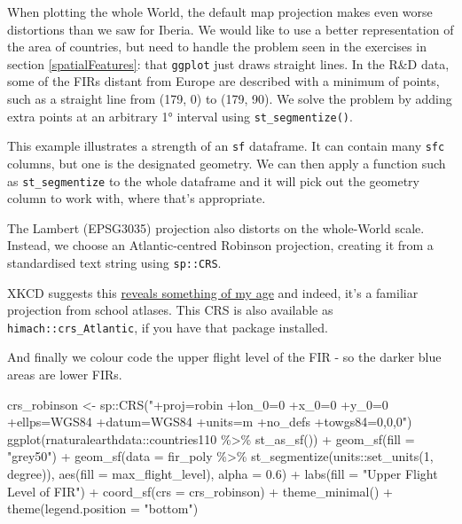 \documentclass[
]{book}
\newenvironment{Shaded}{\begin{snugshade}}{\end{snugshade}}
\newcommand{\AttributeTok}[1]{\textcolor[rgb]{0.77,0.63,0.00}{#1}}
\newcommand{\DecValTok}[1]{\textcolor[rgb]{0.00,0.00,0.81}{#1}}
\newcommand{\FloatTok}[1]{\textcolor[rgb]{0.00,0.00,0.81}{#1}}
\newcommand{\FunctionTok}[1]{\textcolor[rgb]{0.00,0.00,0.00}{#1}}
\newcommand{\NormalTok}[1]{#1}
\newcommand{\OtherTok}[1]{\textcolor[rgb]{0.56,0.35,0.01}{#1}}
\newcommand{\SpecialCharTok}[1]{\textcolor[rgb]{0.00,0.00,0.00}{#1}}
\newcommand{\StringTok}[1]{\textcolor[rgb]{0.31,0.60,0.02}{#1}}
\begin{document}
When plotting the whole World, the default map projection makes even worse distortions than we saw for Iberia. We would like to use a better representation of the area of countries, but need to handle the problem seen in the exercises in section \ref{spatialFeatures}: that \texttt{ggplot} just draws straight lines. In the R\&D data, some of the FIRs distant from Europe are described with a minimum of points, such as a straight line from (179, 0) to (179, 90). We solve the problem by adding extra points at an arbitrary 1° interval using \texttt{st\_segmentize()}.

This example illustrates a strength of an \texttt{sf} dataframe. It can contain many \texttt{sfc} columns, but one is the designated geometry. We can then apply a function such as \texttt{st\_segmentize} to the whole dataframe and it will pick out the geometry column to work with, where that's appropriate.

The Lambert (EPSG3035) projection also distorts on the whole-World scale. Instead, we choose an Atlantic-centred Robinson projection, creating it from a standardised text string using \texttt{sp::CRS}.

XKCD suggests this \href{https://xkcd.com/977/}{reveals something of my age} and indeed, it's a familiar projection from school atlases. This CRS is also available as \texttt{himach::crs\_Atlantic}, if you have that package installed.

And finally we colour code the upper flight level of the FIR - so the darker blue areas are lower FIRs.

\begin{Shaded}
\begin{Highlighting}[]
\NormalTok{crs\_robinson }\OtherTok{\textless{}{-}}\NormalTok{ sp}\SpecialCharTok{::}\FunctionTok{CRS}\NormalTok{(}\StringTok{"+proj=robin +lon\_0=0 +x\_0=0 +y\_0=0 +ellps=WGS84 +datum=WGS84 +units=m +no\_defs +towgs84=0,0,0"}\NormalTok{)}
\FunctionTok{ggplot}\NormalTok{(rnaturalearthdata}\SpecialCharTok{::}\NormalTok{countries110 }\SpecialCharTok{\%\textgreater{}\%} 
         \FunctionTok{st\_as\_sf}\NormalTok{()) }\SpecialCharTok{+}
  \FunctionTok{geom\_sf}\NormalTok{(}\AttributeTok{fill =} \StringTok{"grey50"}\NormalTok{) }\SpecialCharTok{+} 
  \FunctionTok{geom\_sf}\NormalTok{(}\AttributeTok{data =}\NormalTok{ fir\_poly }\SpecialCharTok{\%\textgreater{}\%} 
            \FunctionTok{st\_segmentize}\NormalTok{(units}\SpecialCharTok{::}\FunctionTok{set\_units}\NormalTok{(}\DecValTok{1}\NormalTok{, degree)), }
          \FunctionTok{aes}\NormalTok{(}\AttributeTok{fill =}\NormalTok{ max\_flight\_level), }\AttributeTok{alpha =} \FloatTok{0.6}\NormalTok{) }\SpecialCharTok{+}
  \FunctionTok{labs}\NormalTok{(}\AttributeTok{fill =} \StringTok{"Upper Flight Level of FIR"}\NormalTok{) }\SpecialCharTok{+}
  \FunctionTok{coord\_sf}\NormalTok{(}\AttributeTok{crs =}\NormalTok{ crs\_robinson) }\SpecialCharTok{+}
  \FunctionTok{theme\_minimal}\NormalTok{() }\SpecialCharTok{+} \FunctionTok{theme}\NormalTok{(}\AttributeTok{legend.position =} \StringTok{"bottom"}\NormalTok{)}
\end{Highlighting}
\end{Shaded}
\end{document}
